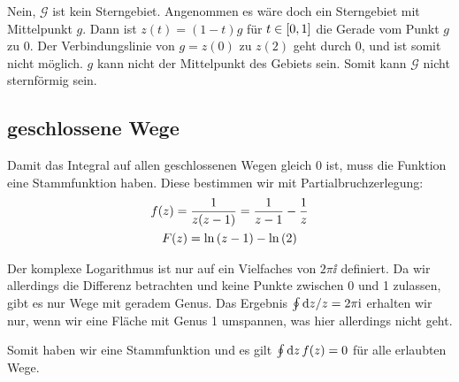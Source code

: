 Nein, $\mathcal G$ ist kein Sterngebiet. Angenommen es wäre doch ein
Sterngebiet mit Mittelpunkt $g$. Dann ist $z(t) = (1-t) g$ für $t \in \intcc{0,
1}$ die Gerade vom Punkt $g$ zu $0$. Der Verbindungslinie von $g = z(0)$ zu
$z(2)$ geht durch 0, und ist somit nicht möglich. $g$ kann nicht der
Mittelpunkt des Gebiets sein. Somit kann $\mathcal G$ nicht sternförmig sein.

\subsection{geschlossene Wege}

Damit das Integral auf allen geschlossenen Wegen gleich 0 ist, muss die
Funktion eine Stammfunktion haben. Diese bestimmen wir mit
Partialbruchzerlegung:
\begin{gather*}
	f(z) = \frac{1}{z(z-1)} = \frac{1}{z-1} - \frac 1z \\
	F(z) = \ln\del{z-1} - \ln\del2
\end{gather*}

Der komplexe Logarithmus ist nur auf ein Vielfaches von $2 \pi \ii$ definiert.
Da wir allerdings die Differenz betrachten und keine Punkte zwischen 0 und 1
zulassen, gibt es nur Wege mit geradem Genus. Das Ergebnis $\oint \dif z / z =
2 \pi \ii$ erhalten wir nur, wenn wir eine Fläche mit Genus 1 umspannen, was
hier allerdings nicht geht.

Somit haben wir eine Stammfunktion und es gilt $\oint \dif z \, f(z) = 0$ für
alle erlaubten Wege.

%
%



